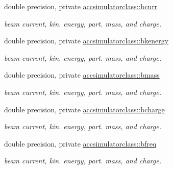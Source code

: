 \textbf{ }\par
\begin{DoxyCompactItemize}
\item 
double precision, private \mbox{\hyperlink{namespaceaccsimulatorclass_a23e215553c71a45286be97992358dd87}{accsimulatorclass\+::bcurr}}
\begin{DoxyCompactList}\small\item\em beam current, kin. energy, part. mass, and charge. \end{DoxyCompactList}\item 
double precision, private \mbox{\hyperlink{namespaceaccsimulatorclass_af510330940fc024c5092b4fd361c736e}{accsimulatorclass\+::bkenergy}}
\begin{DoxyCompactList}\small\item\em beam current, kin. energy, part. mass, and charge. \end{DoxyCompactList}\item 
double precision, private \mbox{\hyperlink{namespaceaccsimulatorclass_a3f5beb7f11359c926cdc41f78c84334d}{accsimulatorclass\+::bmass}}
\begin{DoxyCompactList}\small\item\em beam current, kin. energy, part. mass, and charge. \end{DoxyCompactList}\item 
double precision, private \mbox{\hyperlink{namespaceaccsimulatorclass_acc8e97a5abe7b5feb49058c5e9a8a5f5}{accsimulatorclass\+::bcharge}}
\begin{DoxyCompactList}\small\item\em beam current, kin. energy, part. mass, and charge. \end{DoxyCompactList}\item 
double precision, private \mbox{\hyperlink{namespaceaccsimulatorclass_a770319e9213788860e586df0ffacd465}{accsimulatorclass\+::bfreq}}
\begin{DoxyCompactList}\small\item\em beam current, kin. energy, part. mass, and charge. \end{DoxyCompactList}\end{DoxyCompactItemize}


